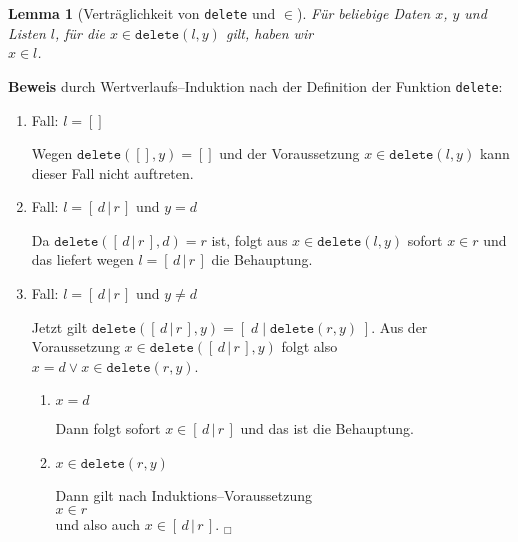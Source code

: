 \documentclass{article}
\newtheorem{Lemma}[Definition]{Lemma}
\begin{document}
\begin{Lemma}[Vertr\"aglichkeit von \texttt{delete} und $\in$] 
\label{l9}
F\"ur beliebige Daten $x$, $y$ und Listen $l$, f\"ur die $x \in \mathtt{delete}(l,y)$ gilt, haben wir \\[0.1cm]
\hspace*{1.3cm} $x \in l$.
\end{Lemma}
\textbf{Beweis} durch Wertverlaufs--Induktion nach der Definition der Funktion \texttt{delete}:
\begin{enumerate}
\item Fall: $l = []$

      Wegen  $\mathtt{delete}([],y) = []$ und der Voraussetzung $x \in \mathtt{delete}(l,y)$ 
      kann dieser Fall nicht auftreten.
\item Fall: $l = [\,d\,|\,r\,]$ und $y = d$

      Da $\mathtt{delete}([\,d\,|\,r\,],d) = r$ ist, folgt aus  $x \in \mathtt{delete}(l,y)$ sofort
       $x \in r$ und das liefert wegen $l = [\,d\,|\,r\,]$ die Behauptung.
\item Fall: $l = [\,d\,|\,r\,]$ und $y \not= d$

      Jetzt gilt $\mathtt{delete}([\,d\,|\,r\,],y) = [\;d\;|\;\mathtt{delete}(r,y)\;]$. 
      Aus der Voraussetzung $x \in \mathtt{delete}([\,d\,|\,r\,],y)$ folgt also \\[0.1cm]
      \hspace*{1.3cm} $x = d \vee x \in \mathtt{delete}(r,y)$. 
      \begin{enumerate}
      \item $x= d$

            Dann folgt sofort $x\in [\,d\,|\,r\,]$ und das ist die Behauptung.
      \item $x \in \mathtt{delete}(r,y)$

            Dann gilt nach Induktions--Voraussetzung \\[0.1cm]
            \hspace*{1.3cm} $x \in r$ \\[0.1cm]
            und also auch $x \in [\,d\,|\,r\,]$.
            \hspace*{\fill} $_\Box$
      \end{enumerate}
\end{enumerate}
\end{document}
